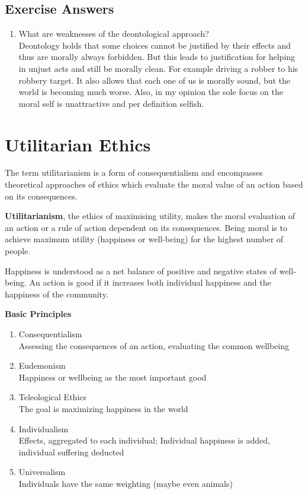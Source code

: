 \documentclass[11pt]{article}
\theoremstyle{definition}
\begin{document}
\subsection{Exercise Answers}
\begin{enumerate}
	\item What are weaknesses of the deontological approach?\\
	Deontology holds that some choices cannot be justified by their effects and thus are morally always forbidden. But this leads to justification for helping in unjust acts and still be morally clean. For example driving a robber to his robbery target. It also allows that each one of us is morally sound, but the world is becoming much worse. Also, in my opinion the sole focus on the moral self is unattractive and per definition selfish.
\end{enumerate}

\clearpage
\section{Utilitarian Ethics}
The term utilitarianism is a form of consequentialism and encompasses theoretical approaches of ethics which evaluate the moral value of an action based on its consequences.
\begin{definition}
	\textbf{Utilitarianism}, the ethics of maximising utility, makes the moral evaluation of an action or a rule of action dependent on its consequences. Being moral is to achieve maximum utility (happiness or well-being) for the highest number of people.
\end{definition}
Happiness is understood as a net balance of positive and negative states of well-being.  An action is good if it increases both individual happiness and the happiness of the community.

\vspace{1em}
\noindent
\textbf{Basic Principles}
\begin{enumerate}
	\item Consequentialism\\
	Assessing the consequences of an action, evaluating the common wellbeing
	\item Eudemonism\\
	Happiness or wellbeing as the most important good
	\item Teleological Ethics\\
	The goal is maximizing happiness in the world
	\item Individualism\\
	Effects, aggregated to each individual; Individual happiness is added, individual suffering deducted
	\item Universalism\\
	Individuals have the same weighting (maybe even animals)
\end{enumerate}
\end{document}
